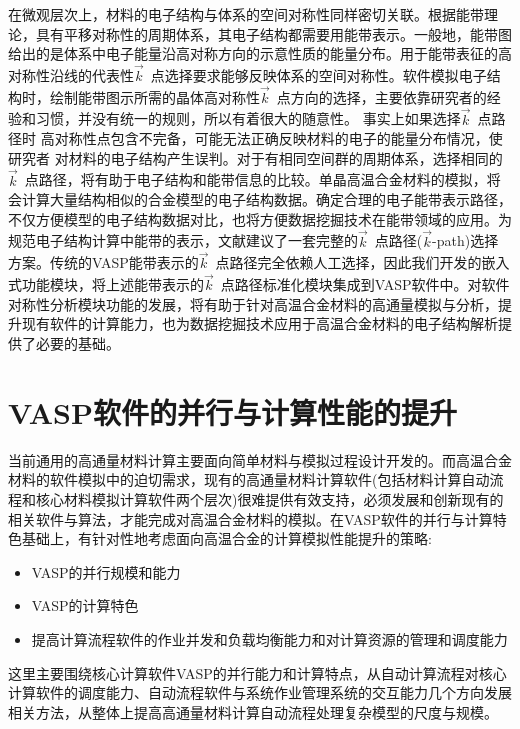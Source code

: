 在微观层次上，材料的电子结构与体系的空间对称性同样密切关联。根据能带理论，具有平移对称性的周期体系，其电子结构都需要用能带表示。一般地，能带图给出的是体系中电子能量沿高对称方向的示意性质的能量分布。用于能带表征的高对称性沿线的代表性$\vec k$~点选择要求能够反映体系的空间对称性。软件模拟电子结构时，绘制能带图示所需的晶体高对称性$\vec k$~点方向的选择，主要依靠研究者的经验和习惯，并没有统一的规则，所以有着很大的随意性。%
事实上如果选择$\vec k$~点路径时%
高对称性点包含不完备，可能无法正确反映材料的电子的能量分布情况，使研究者%
对材料的电子结构产生误判。对于有相同空间群的周期体系，选择相同的$\vec k$~点路径，将有助于电子结构和能带信息的比较。单晶高温合金材料的模拟，将会计算大量结构相似的合金模型的电子结构数据。确定合理的电子能带表示路径，不仅方便模型的电子结构数据对比，也将方便数据挖掘技术在能带领域的应用。为规范电子结构计算中能带的表示，文献\cite{CMS49-299_2010}建议了一套完整的$\vec k$~点路径($\vec k$-\textrm{path})选择方案。传统的\textrm{VASP}能带表示的$\vec k$~点路径完全依赖人工选择，因此我们开发的嵌入式功能模块，将上述能带表示的$\vec k$~点路径标准化模块集成到\textrm{VASP}软件中。对软件对称性分析模块功能的发展，将有助于针对高温合金材料的高通量模拟与分析，提升现有软件的计算能力，也为数据挖掘技术应用于高温合金材料的电子结构解析提供了必要的基础。

\section{\rm{VASP}软件的并行与计算性能的提升}
当前通用的高通量材料计算主要面向简单材料与模拟过程设计开发的。而高温合金材料的软件模拟中的迫切需求，现有的高通量材料计算软件(包括材料计算自动流程和核心材料模拟计算软件两个层次)很难提供有效支持，必须发展和创新现有的相关软件与算法，才能完成对高温合金材料的模拟。在\textrm{VASP}软件的并行与计算特色基础上，有针对性地考虑面向高温合金的计算模拟性能提升的策略:
\begin{itemize}
	\item \textrm{VASP}的并行规模和能力
	\item \textrm{VASP}的计算特色
	\item 提高计算流程软件的作业并发和负载均衡能力和对计算资源的管理和调度能力
\end{itemize}
这里主要围绕核心计算软件\textrm{VASP}的并行能力和计算特点，从自动计算流程对核心计算软件的调度能力、自动流程软件与系统作业管理系统的交互能力几个方向发展相关方法，从整体上提高高通量材料计算自动流程处理复杂模型的尺度与规模。

